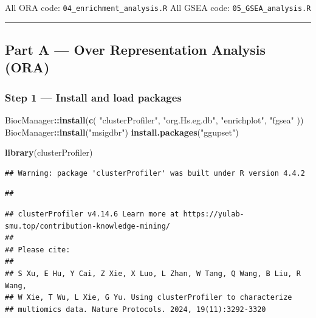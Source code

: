 \documentclass[
]{article}
\newenvironment{Shaded}{\begin{snugshade}}{\end{snugshade}}
\newcommand{\FunctionTok}[1]{\textcolor[rgb]{0.13,0.29,0.53}{\textbf{#1}}}
\newcommand{\NormalTok}[1]{#1}
\newcommand{\SpecialCharTok}[1]{\textcolor[rgb]{0.81,0.36,0.00}{\textbf{#1}}}
\newcommand{\StringTok}[1]{\textcolor[rgb]{0.31,0.60,0.02}{#1}}
\begin{document}
All ORA code: \texttt{04\_enrichment\_analysis.R} All GSEA code:
\texttt{05\_GSEA\_analysis.R}

\begin{center}\rule{0.5\linewidth}{0.5pt}\end{center}

\subsection{Part A --- Over Representation Analysis
(ORA)}\label{part-a-over-representation-analysis-ora}

\subsubsection{Step 1 --- Install and load
packages}\label{step-1-install-and-load-packages}

\begin{Shaded}
\begin{Highlighting}[]
\NormalTok{BiocManager}\SpecialCharTok{::}\FunctionTok{install}\NormalTok{(}\FunctionTok{c}\NormalTok{(}
    \StringTok{"clusterProfiler"}\NormalTok{,}
    \StringTok{"org.Hs.eg.db"}\NormalTok{,}
    \StringTok{"enrichplot"}\NormalTok{,}
    \StringTok{"fgsea"}
\NormalTok{))}
\NormalTok{BiocManager}\SpecialCharTok{::}\FunctionTok{install}\NormalTok{(}\StringTok{"msigdbr"}\NormalTok{)}
\FunctionTok{install.packages}\NormalTok{(}\StringTok{"ggupset"}\NormalTok{)}
\end{Highlighting}
\end{Shaded}

\begin{Shaded}
\begin{Highlighting}[]
\FunctionTok{library}\NormalTok{(clusterProfiler)}
\end{Highlighting}
\end{Shaded}

\begin{verbatim}
## Warning: package 'clusterProfiler' was built under R version 4.4.2
\end{verbatim}

\begin{verbatim}
## 
\end{verbatim}

\begin{verbatim}
## clusterProfiler v4.14.6 Learn more at https://yulab-smu.top/contribution-knowledge-mining/
## 
## Please cite:
## 
## S Xu, E Hu, Y Cai, Z Xie, X Luo, L Zhan, W Tang, Q Wang, B Liu, R Wang,
## W Xie, T Wu, L Xie, G Yu. Using clusterProfiler to characterize
## multiomics data. Nature Protocols. 2024, 19(11):3292-3320
\end{verbatim}
\end{document}
